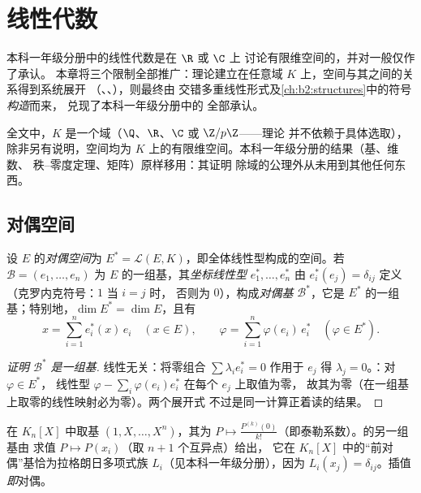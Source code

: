 \chapter{线性代数}\label{ch:b2:linalg}

本科一年级分册中的线性代数是在 $\R$ 或 $\C$ 上
讨论有限维空间的，并对一般仅作了承认。
本章将三个限制全部推广：理论建立在任意域
$K$ 上，空间与其\emph{}之间的关系得到系统展开
（、、），则最终由
交错多重线性形式及\cref{ch:b2:structures}中的符号\emph{构造}而来，
兑现了本科一年级分册中的
全部承认。

全文中，$K$ 是一个域（$\Q$、$\R$、$\C$ 或 $\Z/p\Z$——理论
并不依赖于具体选取），除非另有说明，空间均为
$K$ 上的有限维空间。本科一年级分册的结果（基、维数、
秩--零度定理、矩阵）原样移用：其证明
除域的公理外从未用到其他任何东西。

\section{对偶空间}

\begin{definition}\label{def:b2:linalg:dual}
设 $E$ 的\emph{对偶空间}为 $E^* = \mathcal{L}(E,
K)$，即全体线性型构成的空间。若 $\mathcal{B} = (e_1, \dots, e_n)$
为 $E$ 的一组基，其\emph{坐标线性型} $e_1^*, \dots, e_n^*$
由 $e_i^*(e_j) = \delta_{ij}$ 定义（克罗内克符号：$1$ 当 $i = j$ 时，
否则为 $0$），构成\emph{对偶基}
$\mathcal{B}^*$，它是 $E^*$ 的一组基；特别地，$\dim E^* = \dim E$，且有
\[
x = \sum_{i=1}^{n} e_i^*(x)\, e_i \quad (x \in E),
\qquad
\varphi = \sum_{i=1}^{n} \varphi(e_i)\, e_i^* \quad (\varphi \in
E^*).
\]
\end{definition}

\begin{proof}[证明 $\mathcal{B}^*$ 是一组基]
线性无关：将零组合 $\sum \lambda_i e_i^* = 0$ 作用于
$e_j$ 得 $\lambda_j = 0$。：对 $\varphi \in E^*$，
线性型 $\varphi - \sum_i \varphi(e_i) e_i^*$ 在每个 $e_j$ 上取值为零，
故其为零（在一组基上取零的线性映射必为零）。两个展开式
不过是同一计算正着读的结果。
\end{proof}

\begin{example}\label{ex:b2:linalg:dualexamples}
在 $K_n[X]$ 中取基 $(1, X, \dots, X^n)$，其为 $P
\mapsto \frac{P^{(k)}(0)}{k!}$（即泰勒系数）。的另一组基由
求值 $P \mapsto P(x_i)$（取 $n + 1$ 个互异点）给出，
它在 $K_n[X]$ 中的“前对偶”基恰为拉格朗日多项式族
$L_i$（见本科一年级分册），因为 $L_i(x_j) =
\delta_{ij}$。插值\emph{即}对偶。
\end{example}

